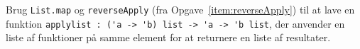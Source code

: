 Brug \lstinline{List.map} og \lstinline{reverseApply} (fra Opgave~\ref{item:reverseApply}) til at lave en funktion \lstinline{applylist : ('a -> 'b) list -> 'a -> 'b list}, der anvender en liste af funktioner på samme element for at returnere en liste af resultater.
